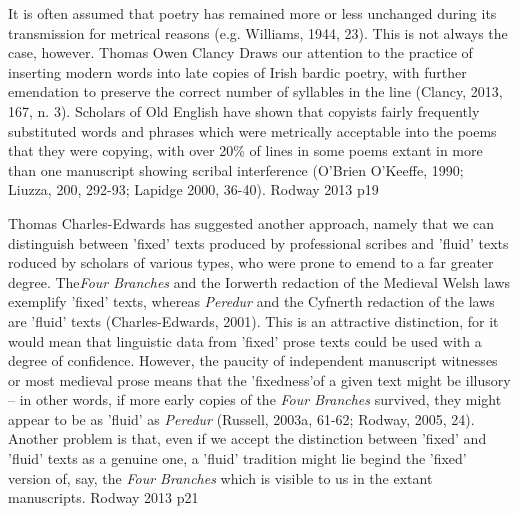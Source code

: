 
It is often assumed that poetry has remained more or less unchanged during its transmission for metrical reasons (e.g. Williams, 1944, 23). This is not always the case, however. Thomas Owen Clancy Draws our attention to the practice of inserting modern words into late copies of Irish bardic poetry, with further emendation to preserve the correct number of syllables in the line (Clancy, 2013, 167, n. 3). Scholars of Old English have shown that copyists fairly frequently substituted words and phrases which were metrically acceptable into the poems that they were copying, with over 20\% of lines in some poems extant in more than one manuscript showing scribal interference (O'Brien O'Keeffe, 1990; Liuzza, 200, 292-93; Lapidge 2000, 36-40). Rodway 2013 p19

Thomas Charles-Edwards has suggested another approach, namely that we can distinguish between 'fixed' texts produced by professional scribes and 'fluid' texts roduced by scholars of various types, who were prone to emend to a far greater degree. The\textit{Four Branches} and the Iorwerth redaction of the Medieval Welsh laws exemplify 'fixed' texts, whereas \textit{Peredur} and the Cyfnerth redaction of the laws are 'fluid' texts (Charles-Edwards, 2001). This is an attractive distinction, for it would mean that linguistic data from 'fixed' prose texts could be used with a degree of confidence. However, the paucity of independent manuscript witnesses or most medieval prose means that the 'fixedness'of a given text might be illusory -- in other words, if more early copies of the \textit{Four Branches}  survived, they might appear to be as 'fluid' as \textit{Peredur} (Russell, 2003a, 61-62; Rodway, 2005, 24). Another problem is that, even if we accept the distinction between 'fixed' and 'fluid' texts as a genuine one, a 'fluid' tradition might lie begind the 'fixed' version of, say, the \textit{Four Branches} which is visible to us in the extant manuscripts. Rodway 2013 p21

